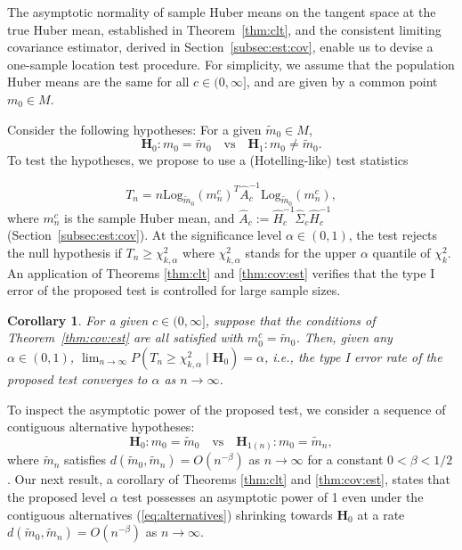 \documentclass[preprint]{imsart}
\theoremstyle{plain}
\newtheorem{corollary}{Corollary}
\theoremstyle{remark}
\begin{document}
The asymptotic normality of sample Huber means on the tangent space at the true Huber mean, established in Theorem~\ref{thm:clt}, and the consistent limiting covariance estimator, derived in Section~\ref{subsec:est:cov}, enable us to devise a one-sample location test procedure. 
For simplicity, we assume that the population Huber means are the same for all $c \in (0, \infty]$, and are given by a common point $m_0 \in M$. 

Consider the following hypotheses: For a given $\tilde{m}_0 \in M$, $$\textbf{H}_{0}: m_0 = \tilde{m}_{0} \quad \mbox{vs} \quad \textbf{H}_{1}: m_{0} \neq \tilde{m}_{0}.$$ 
To test the hypotheses, we propose to use a (Hotelling-like) test statistics 

$$
T_{n} = n \mbox{Log}_{\tilde{m}_0}(m^{c}_{n})^{T} \hat{A}^{-1}_{c} \mbox{Log}_{\tilde{m}_0}(m^{c}_{n}),    
$$
where $m^c_n$ is the sample Huber mean, and $\hat{A}_c := \hat{H}_c^{-1} \hat\Sigma_c \hat{H}_c^{-1}$ (Section~\ref{subsec:est:cov}). At the significance level $\alpha \in (0,1)$, the test rejects the null hypothesis if $T_{n} \ge \chi^{2}_{k, \alpha}$ where $\chi^{2}_{k, \alpha}$ stands for the upper $\alpha$ quantile of $\chi^{2}_{k}$.
%
An application of Theorems \ref{thm:clt} and \ref{thm:cov:est} verifies that the type I error of the proposed test is controlled for large sample sizes.


\begin{corollary}\label{cor:hypotest}
For a given $c \in (0,\infty]$, suppose that the conditions of Theorem~\ref{thm:cov:est} are all satisfied with $m_0^c = \tilde{m}_0$. Then, given any $\alpha \in (0, 1)$, $\lim_{n\to\infty} P(T_n \ge \chi^2_{k,\alpha} \mid \textbf{H}_{0}) = \alpha$, i.e., the type I error rate of the proposed test converges to $\alpha$ as $n \rightarrow \infty$. 
\end{corollary}

 
To inspect the asymptotic power of the proposed test, we consider a sequence of contiguous alternative hypotheses: 
\begin{equation}
    \label{eq:alternatives}
    \textbf{H}_{0}: m_0 = \tilde{m}_{0} \quad \mbox{vs} \quad \textbf{H}_{1(n)}: m_{0} = \tilde{m}_{n},
\end{equation} 
where $\tilde{m}_{n}$ satisfies $d(\tilde{m}_{0}, \tilde{m}_{n}) = O(n^{-\beta})$ as $n\rightarrow \infty$ for a constant $0 < \beta < 1/2$.
Our next result, a corollary of Theorems \ref{thm:clt} and \ref{thm:cov:est}, states that the proposed level $\alpha$ test possesses an asymptotic power of 1 even under the contiguous alternatives (\ref{eq:alternatives}) shrinking towards $\mathbf{H}_{0}$ at a rate $d(\tilde{m}_0, \tilde{m}_{n}) = O(n^{-\beta})$ as $n\rightarrow \infty$. 
\end{document}
